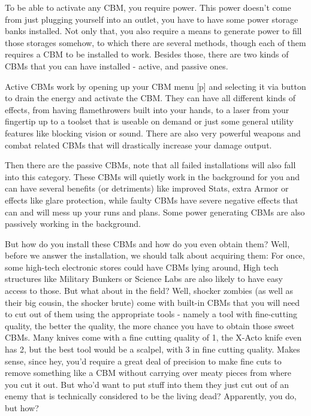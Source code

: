 To be able to activate any CBM, you require power. This power doesn't come from just plugging yourself into an outlet, you have to have some power storage banks installed. Not only that, you also require a means to generate power to fill those storages somehow, to which there are several methods, though each of them requires a CBM to be installed to work. Besides those, there are two kinds of CBMs that you can have installed - active, and passive ones.

Active CBMs work by opening up your CBM menu [p] and selecting it via button to drain the energy and activate the CBM. They can have all different kinds of effects, from having flamethrowers built into your hands, to a laser from your fingertip up to a toolset that is useable on demand or just some general utility features like blocking vision or sound. There are also very powerful weapons and combat related CBMs that will drastically increase your damage output.

Then there are the passive CBMs, note that all failed installations will also fall into this category. These CBMs will quietly work in the background for you and can have several benefits (or detriments) like improved Stats, extra Armor or effects like glare protection, while faulty CBMs have severe negative effects that can and will mess up your runs and plans. Some power generating CBMs are also passively working in the background.

But how do you install these CBMs and how do you even obtain them? Well, before we answer the installation, we should talk about acquiring them: For once, some high-tech electronic stores could have CBMs lying around, High tech structures like Military Bunkers or Science Labs are also likely to have easy access to those. But what about in the field? Well, shocker zombies (as well as their big cousin, the shocker brute) come with built-in CBMs that you will need to cut out of them using the appropriate tools - namely a tool with fine-cutting quality, the better the quality, the more chance you have to obtain those sweet CBMs. Many knives come with a fine cutting quality of 1, the X-Acto knife even has 2, but the best tool would be a scalpel, with 3 in fine cutting quality. Makes sense, since hey, you'd require a great deal of precision to make fine cuts to remove something like a CBM without carrying over meaty pieces from where you cut it out. But who'd want to put stuff into them they just cut out of an enemy that is technically considered to be the living dead? Apparently, you do, but how?

